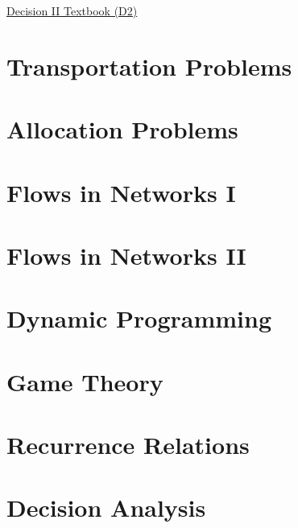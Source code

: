 \href{https://drive.google.com/drive/folders/1sP9eVbfbHurmlSf9t7K7DOXmUspDS0hR}{\hypertarget{book:D2}{Decision II Textbook (D2)}}

\section{Transportation Problems} \label{transportation_problems}
\newpage
\section{Allocation Problems} \label{allocation_problems}
\newpage
\section{Flows in Networks I} \label{flows_in_networks_i}
\newpage
\section{Flows in Networks II} \label{flows_in_networks_ii}
\newpage
\section{Dynamic Programming} \label{dynamic_programming}
\newpage
\section{Game Theory} \label{game_theory}
\newpage
\section{Recurrence Relations} \label{recurrence_relations}
\newpage
\section{Decision Analysis} \label{decision_analysis}
\newpage